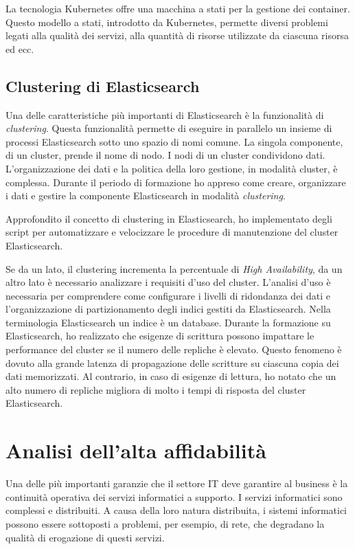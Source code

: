 La tecnologia Kubernetes offre una macchina a stati per la gestione dei container.
Questo modello a stati, introdotto da Kubernetes, permette diversi problemi 
legati alla qualità dei servizi, alla quantità di risorse 
utilizzate da ciascuna risorsa ed ecc.

\subsection{Clustering di Elasticsearch}
Una delle caratteristiche più importanti di Elasticsearch è
la funzionalità di \textit{clustering}. Questa funzionalità
permette di eseguire in parallelo un insieme di 
processi Elasticsearch sotto uno spazio di nomi
comune. La singola componente, di un cluster, prende 
il nome di nodo. I nodi di un cluster condividono
dati. L'organizzazione dei dati e la politica della 
loro gestione, in modalità cluster,
è complessa. Durante il periodo di formazione 
ho appreso come creare, organizzare i dati e gestire
la componente Elasticsearch in modalità \textit{clustering}.

Approfondito il concetto di clustering in Elasticsearch,
ho implementato degli script per automatizzare e velocizzare
le procedure di manutenzione del cluster Elasticsearch. 

Se da un lato, il clustering incrementa la percentuale di 
\textit{High Availability}, da un altro lato è necessario 
analizzare i requisiti d'uso del cluster. L'analisi d'uso 
è necessaria per comprendere come configurare i livelli di 
ridondanza dei dati e l'organizzazione di partizionamento
degli indici gestiti da Elasticsearch. Nella terminologia 
Elasticsearch un indice è un database. Durante la formazione
su Elasticsearch, ho realizzato che esigenze di scrittura 
possono impattare le performance del cluster se il 
numero delle repliche è elevato. Questo fenomeno è
dovuto alla grande latenza di propagazione delle 
scritture su ciascuna copia dei dati memorizzati.
Al contrario, in caso di esigenze di lettura, ho 
notato che un alto numero di repliche 
migliora di molto i tempi di risposta del cluster 
Elasticsearch.  

\section{Analisi dell'alta affidabilità}
Una delle più importanti garanzie che il settore IT deve garantire 
al business è la continuità operativa dei servizi informatici a 
supporto. I servizi informatici sono complessi e distribuiti.
A causa della loro natura distribuita, i sistemi informatici 
possono essere sottoposti a problemi, per esempio, di rete, 
che degradano la qualità di erogazione di questi servizi.

